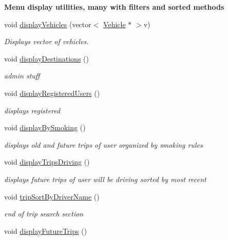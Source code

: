 \begin{Indent}{\bf Menu display utilities, many with filters and sorted methods}\par
\begin{DoxyCompactItemize}
\item 
void \hyperlink{class_lyfter_aeb8ac80cae0b949f669f94c411ad5075}{display\+Vehicles} (vector$<$ \hyperlink{class_vehicle}{Vehicle} $\ast$ $>$v)
\begin{DoxyCompactList}\small\item\em Displays vector of vehicles. \end{DoxyCompactList}\item 
void \hyperlink{class_lyfter_a930bb53c14718ab927781fe465dd22de}{display\+Destinations} ()
\begin{DoxyCompactList}\small\item\em admin stuff \end{DoxyCompactList}\item 
void \hyperlink{class_lyfter_afbef582a4f2dacdd39e5ef989655a9c6}{display\+Registered\+Users} ()
\begin{DoxyCompactList}\small\item\em displays registered \end{DoxyCompactList}\item 
\hypertarget{class_lyfter_a76675994f2464369d074e54aaa3afba2}{void \hyperlink{class_lyfter_a76675994f2464369d074e54aaa3afba2}{display\+By\+Smoking} ()}\label{class_lyfter_a76675994f2464369d074e54aaa3afba2}

\begin{DoxyCompactList}\small\item\em displays old and future trips of user organized by smoking rules \end{DoxyCompactList}\item 
\hypertarget{class_lyfter_a6467d063455ec01e5af4730d2ac307d4}{void \hyperlink{class_lyfter_a6467d063455ec01e5af4730d2ac307d4}{display\+Trips\+Driving} ()}\label{class_lyfter_a6467d063455ec01e5af4730d2ac307d4}

\begin{DoxyCompactList}\small\item\em displays future trips of user will be driving sorted by most recent \end{DoxyCompactList}\item 
void \hyperlink{class_lyfter_a14f295fbbdabcd83bd93e39c18261495}{trip\+Sort\+By\+Driver\+Name} ()
\begin{DoxyCompactList}\small\item\em end of trip search section \end{DoxyCompactList}\item 
\hypertarget{class_lyfter_aaed629ebf68d9de1422b019d5d659152}{void \hyperlink{class_lyfter_aaed629ebf68d9de1422b019d5d659152}{display\+Future\+Trips} ()}\label{class_lyfter_aaed629ebf68d9de1422b019d5d659152}


\end{DoxyCompactItemize}
\end{Indent}
